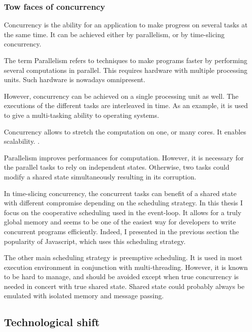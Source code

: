 \subsubsection{Tow faces of concurrency}

Concurrency is the ability for an application to make progress on several tasks at the same time.
It can be achieved either by parallelism, or by time-slicing concurrency.

The term Parallelism refers to techniques to make programs faster by performing several computations in parallel. This requires hardware with multiple processing units. Such hardware is nowadays omnipresent.

However, concurrency can be achieved on a single processing unit as well.
The executions of the different tasks are interleaved in time.
As an example, it is used to give a multi-tasking ability to operating systems.

Concurrency allows to stretch the computation on one, or many cores.
It enables scalability.
.

Parallelism improves performances for computation.
However, it is necessary for the parallel tasks to rely on independent states.
Otherwise, two tasks could modify a shared state simultaneously resulting in its corruption.

In time-slicing concurrency, the concurrent tasks can benefit of a shared state with different compromise depending on the scheduling strategy.
In this thesis I focus on the cooperative scheduling used in the event-loop.
It allows for a truly global memory and seems to be one of the easiest way for developers to write concurrent programs efficiently.
Indeed, I presented in the previous section the popularity of Javascript, which uses this scheduling strategy.

The other main scheduling strategy is preemptive scheduling.
It is used in most execution environment in conjunction with multi-threading.
However, it is known to be hard to manage, and should be avoided except when true concurrency is needed in concert with true shared state.
Shared state could probably always be emulated with isolated memory and message passing.

\subsection{Technological shift}



